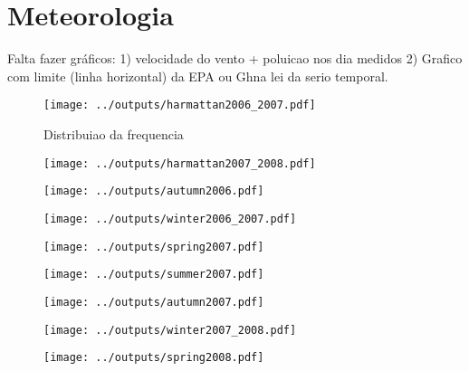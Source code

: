 \section{Meteorologia}

Falta fazer gráficos:
1) velocidade do vento + poluicao nos dia medidos
2) Grafico com limite (linha horizontal) da EPA ou Ghna lei da serio temporal.

\begin{figure}[H]
\begin{center}
  \texttt{[image: ../outputs/harmattan2006\_2007.pdf]}
\end{center}
\caption{Distribuiao da frequencia}
\end{figure}

\begin{figure}[H]
\begin{center}
  \texttt{[image: ../outputs/harmattan2007\_2008.pdf]}
\end{center}
\end{figure}

\begin{figure}[H]
\begin{center}
  \texttt{[image: ../outputs/autumn2006.pdf]}
\end{center}
\end{figure}

\begin{figure}[H]
\begin{center}
  \texttt{[image: ../outputs/winter2006\_2007.pdf]}
\end{center}
\end{figure}

\begin{figure}[H]
\begin{center}
  \texttt{[image: ../outputs/spring2007.pdf]}
\end{center}
\end{figure}

\begin{figure}[H]
\begin{center}
  \texttt{[image: ../outputs/summer2007.pdf]}
\end{center}
\end{figure}

\begin{figure}[H]
\begin{center}
  \texttt{[image: ../outputs/autumn2007.pdf]}
\end{center}
\end{figure}

\begin{figure}[H]
\begin{center}
  \texttt{[image: ../outputs/winter2007\_2008.pdf]}
\end{center}
\end{figure}

\begin{figure}[H]
\begin{center}
  \texttt{[image: ../outputs/spring2008.pdf]}
\end{center}
\end{figure}
